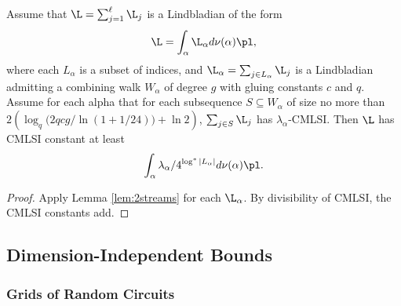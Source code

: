 \begin{theorem} \label{thm:2streams}
    Assume that $\L = \sum_{j=1}^\ell \L_j$ is a Lindbladian of the form
    \begin{equation}
        \L = \int_\alpha \L_\alpha d \nu(\alpha) \pl,
    \end{equation}
    where each $L_\alpha$ is a subset of indices, and $\L_\alpha = \sum_{j \in L_\alpha} \L_{j}$ is a Lindbladian admitting a combining walk $W_\alpha$ of degree $g$ with gluing constants $c$ and $q$. Assume for each alpha that for each subsequence $S \subseteq W_\alpha$ of size no more than $2 (\log_q \big ( 2 q c g / \ln (1 + 1/24) \big ) + \ln 2)$, $\sum_{j \in S} \L_j$ has $\lambda_\alpha$-CMLSI. Then $\L$ has CMLSI constant at least
    \begin{equation}
        \int_\alpha \lambda_\alpha / 4^{\log^* |L_\alpha|} d \nu(\alpha) \pl.
    \end{equation}
\end{theorem}
\begin{proof}
    Apply Lemma \ref{lem:2streams} for each $\L_\alpha$. By divisibility of CMLSI, the CMLSI constants add.
\end{proof}

\subsection{Dimension-Independent Bounds}
\subsubsection{Grids of Random Circuits}

